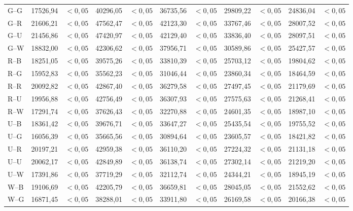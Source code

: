 {\begin{longtable}{@{}lrrrrrrrrrr@{}}
G--G & 17526,94 & $<0{,}05$ & 40296,05 & $<0{,}05$ & 36735,56 & $<0{,}05$ & 29809,22 & $<0{,}05$ & 24836,04 & $<0{,}05$ \\
G--R & 21606,21 & $<0{,}05$ & 47562,47 & $<0{,}05$ & 42123,30 & $<0{,}05$ & 33767,46 & $<0{,}05$ & 28007,52 & $<0{,}05$ \\
G--U & 21456,86 & $<0{,}05$ & 47420,97 & $<0{,}05$ & 42129,40 & $<0{,}05$ & 33836,40 & $<0{,}05$ & 28097,51 & $<0{,}05$ \\
G--W & 18832,00 & $<0{,}05$ & 42306,62 & $<0{,}05$ & 37956,71 & $<0{,}05$ & 30589,86 & $<0{,}05$ & 25427,57 & $<0{,}05$ \\
R--B & 18251,05 & $<0{,}05$ & 39575,26 & $<0{,}05$ & 33810,39 & $<0{,}05$ & 25703,12 & $<0{,}05$ & 19804,62 & $<0{,}05$ \\
R--G & 15952,83 & $<0{,}05$ & 35562,23 & $<0{,}05$ & 31046,44 & $<0{,}05$ & 23860,34 & $<0{,}05$ & 18464,59 & $<0{,}05$ \\
R--R & 20092,82 & $<0{,}05$ & 42867,40 & $<0{,}05$ & 36279,58 & $<0{,}05$ & 27497,45 & $<0{,}05$ & 21179,69 & $<0{,}05$ \\
R--U & 19956,88 & $<0{,}05$ & 42756,49 & $<0{,}05$ & 36307,93 & $<0{,}05$ & 27575,63 & $<0{,}05$ & 21268,41 & $<0{,}05$ \\
R--W & 17291,74 & $<0{,}05$ & 37626,43 & $<0{,}05$ & 32270,88 & $<0{,}05$ & 24601,35 & $<0{,}05$ & 18987,10 & $<0{,}05$ \\
U--B & 18361,42 & $<0{,}05$ & 39676,71 & $<0{,}05$ & 33647,27 & $<0{,}05$ & 25435,54 & $<0{,}05$ & 19755,52 & $<0{,}05$ \\
U--G & 16056,39 & $<0{,}05$ & 35665,56 & $<0{,}05$ & 30894,64 & $<0{,}05$ & 23605,57 & $<0{,}05$ & 18421,82 & $<0{,}05$ \\
U--R & 20197,21 & $<0{,}05$ & 42959,38 & $<0{,}05$ & 36110,20 & $<0{,}05$ & 27224,32 & $<0{,}05$ & 21131,18 & $<0{,}05$ \\
U--U & 20062,17 & $<0{,}05$ & 42849,89 & $<0{,}05$ & 36138,74 & $<0{,}05$ & 27302,14 & $<0{,}05$ & 21219,20 & $<0{,}05$ \\
U--W & 17391,86 & $<0{,}05$ & 37719,29 & $<0{,}05$ & 32112,74 & $<0{,}05$ & 24344,21 & $<0{,}05$ & 18945,19 & $<0{,}05$ \\
W--B & 19106,69 & $<0{,}05$ & 42205,79 & $<0{,}05$ & 36659,81 & $<0{,}05$ & 28045,05 & $<0{,}05$ & 21552,62 & $<0{,}05$ \\
W--G & 16871,45 & $<0{,}05$ & 38288,01 & $<0{,}05$ & 33911,80 & $<0{,}05$ & 26169,58 & $<0{,}05$ & 20166,38 & $<0{,}05$ \\

\end{longtable}}
